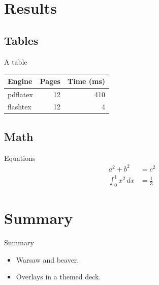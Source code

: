 \documentclass{beamer}
\begin{document}
\section{Results}
\subsection{Tables}
\begin{frame}{A table}
  \begin{center}
  \begin{tabular}{lrr}
    \hline
    Engine & Pages & Time (ms) \\
    \hline
    pdflatex & 12 & 410 \\
    flashtex & 12 & 4 \\
    \hline
  \end{tabular}
  \end{center}
\end{frame}
\subsection{Math}
\begin{frame}{Equations}
  \begin{align}
    a^2 + b^2 &= c^2 \\
    \int_0^1 x^2\,dx &= \tfrac13
  \end{align}
\end{frame}
\section*{Summary}
\begin{frame}{Summary}
  \begin{itemize}
    \item Warsaw and beaver.
    \item<2-> Overlays in a themed deck.
  \end{itemize}
\end{frame}
\end{document}
